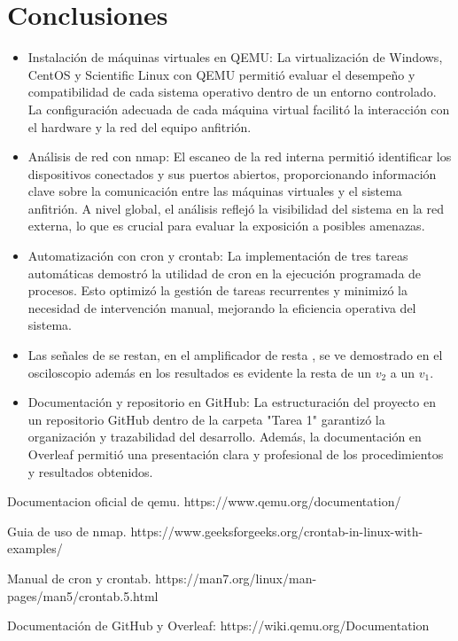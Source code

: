\documentclass[conference]{IEEEtran}
\begin{document}
\section{Conclusiones}
\begin{itemize}
    \item Instalación de máquinas virtuales en QEMU: La virtualización de Windows, CentOS y Scientific Linux con QEMU permitió evaluar el desempeño y compatibilidad de cada sistema operativo dentro de un entorno controlado. La configuración adecuada de cada máquina virtual facilitó la interacción con el hardware y la red del equipo anfitrión.
    \item Análisis de red con nmap: El escaneo de la red interna permitió identificar los dispositivos conectados y sus puertos abiertos, proporcionando información clave sobre la comunicación entre las máquinas virtuales y el sistema anfitrión. A nivel global, el análisis reflejó la visibilidad del sistema en la red externa, lo que es crucial para evaluar la exposición a posibles amenazas.
    \item Automatización con cron y crontab: La implementación de tres tareas automáticas demostró la utilidad de cron en la ejecución programada de procesos. Esto optimizó la gestión de tareas recurrentes y minimizó la necesidad de intervención manual, mejorando la eficiencia operativa del sistema.
    \item Las señales de se restan, en el amplificador de resta , se ve demostrado en el osciloscopio además en los resultados es evidente la resta de un ${v_2}$ a un ${v_1}$.
    \item Documentación y repositorio en GitHub: La estructuración del proyecto en un repositorio GitHub dentro de la carpeta "Tarea 1" garantizó la organización y trazabilidad del desarrollo. Además, la documentación en Overleaf permitió una presentación clara y profesional de los procedimientos y resultados obtenidos.

    
\end{itemize}

\begin{thebibliography}{00}
 Documentacion oficial de qemu.
https://www.qemu.org/documentation/

Guia de uso de nmap.
https://www.geeksforgeeks.org/crontab-in-linux-with-examples/

Manual de cron y crontab.
https://man7.org/linux/man-pages/man5/crontab.5.html

Documentación de GitHub y Overleaf:
https://wiki.qemu.org/Documentation
\end{thebibliography}
\end{document}
